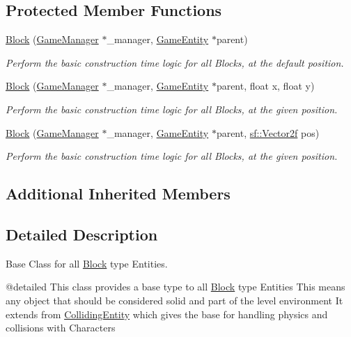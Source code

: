 \subsection*{Protected Member Functions}
\begin{DoxyCompactItemize}
\item 
\mbox{\hyperlink{class_block_a3f8aa5b6f9bc441c52b2fe94c97822f9}{Block}} (\mbox{\hyperlink{class_game_manager}{Game\+Manager}} $\ast$\+\_\+manager, \mbox{\hyperlink{class_game_entity}{Game\+Entity}} $\ast$parent)
\begin{DoxyCompactList}\small\item\em Perform the basic construction time logic for all Blocks, at the default position. \end{DoxyCompactList}\item 
\mbox{\hyperlink{class_block_a879d40dca10328229b91b4580d803eb4}{Block}} (\mbox{\hyperlink{class_game_manager}{Game\+Manager}} $\ast$\+\_\+manager, \mbox{\hyperlink{class_game_entity}{Game\+Entity}} $\ast$parent, float x, float y)
\begin{DoxyCompactList}\small\item\em Perform the basic construction time logic for all Blocks, at the given position. \end{DoxyCompactList}\item 
\mbox{\hyperlink{class_block_abee0f2138d09318e3fc619e3e288d5f7}{Block}} (\mbox{\hyperlink{class_game_manager}{Game\+Manager}} $\ast$\+\_\+manager, \mbox{\hyperlink{class_game_entity}{Game\+Entity}} $\ast$parent, \mbox{\hyperlink{classsf_1_1_vector2}{sf\+::\+Vector2f}} pos)
\begin{DoxyCompactList}\small\item\em Perform the basic construction time logic for all Blocks, at the given position. \end{DoxyCompactList}\end{DoxyCompactItemize}
\subsection*{Additional Inherited Members}


\subsection{Detailed Description}
Base Class for all \mbox{\hyperlink{class_block}{Block}} type Entities. 

@detailed This class provides a base type to all \mbox{\hyperlink{class_block}{Block}} type Entities This means any object that should be considered solid and part of the level environment It extends from \mbox{\hyperlink{class_colliding_entity}{Colliding\+Entity}} which gives the base for handling physics and collisions with Characters 

